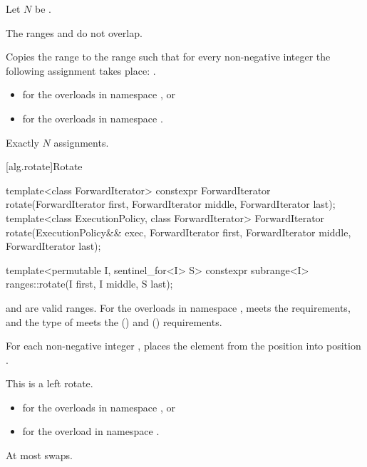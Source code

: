 \begin{itemdescr}
\pnum
Let $N$ be .

\pnum
\expects
The ranges  and 
do not overlap.

\pnum
\effects
Copies the range  to the range 
such that for every non-negative integer 
the following assignment takes place:
.

\pnum
\returns
\begin{itemize}
\item
   for the overloads in namespace , or
\item
   for the overloads in namespace .
\end{itemize}

\pnum
\complexity
Exactly $N$ assignments.
\end{itemdescr}

[alg.rotate]{Rotate}

%
\begin{itemdecl}
template<class ForwardIterator>
  constexpr ForwardIterator
    rotate(ForwardIterator first, ForwardIterator middle, ForwardIterator last);
template<class ExecutionPolicy, class ForwardIterator>
  ForwardIterator
    rotate(ExecutionPolicy&& exec,
           ForwardIterator first, ForwardIterator middle, ForwardIterator last);

template<permutable I, sentinel_for<I> S>
  constexpr subrange<I> ranges::rotate(I first, I middle, S last);
\end{itemdecl}

\begin{itemdescr}
\pnum
\expects
{} and  are valid ranges.
For the overloads in namespace ,
 meets
the  requirements, and
the type of  meets
the  () and
 () requirements.

\pnum
\effects
For each non-negative integer ,
places the element from the position 
into position .
\begin{note}
This is a left rotate.
\end{note}

\pnum
\returns
\begin{itemize}
\item
  for the overloads in namespace , or
\item
  for the overload in namespace .
\end{itemize}

\pnum
\complexity
At most  swaps.
\end{itemdescr}

